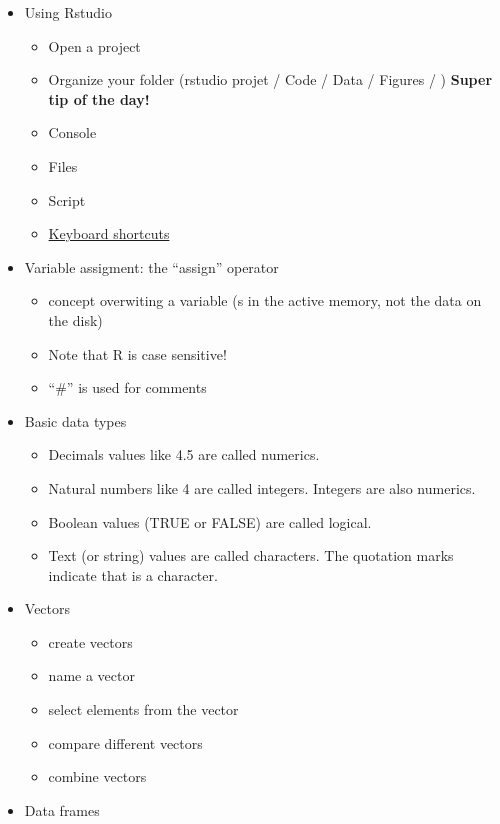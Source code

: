 \documentclass[]{book}
\providecommand{\tightlist}{%
  \setlength{\itemsep}{0pt}\setlength{\parskip}{0pt}}
\theoremstyle{definition}
\theoremstyle{definition}
\theoremstyle{definition}
\theoremstyle{remark}
\begin{document}
\begin{itemize}
\tightlist
\item
  Using Rstudio

  \begin{itemize}
  \tightlist
  \item
    Open a project
  \item
    Organize your folder (rstudio projet / Code / Data / Figures / )
    \textbf{Super tip of the day!}
  \item
    Console
  \item
    Files
  \item
    Script
  \item
    \href{https://support.rstudio.com/hc/en-us/articles/200711853-Keyboard-Shortcuts}{Keyboard
    shortcuts}
  \end{itemize}
\item
  Variable assigment: the ``assign'' operator

  \begin{itemize}
  \tightlist
  \item
    concept overwiting a variable (s in the active memory, not the data
    on the disk)
  \item
    Note that R is case sensitive!
  \item
    ``\#'' is used for comments
  \end{itemize}
\item
  Basic data types

  \begin{itemize}
  \tightlist
  \item
    Decimals values like 4.5 are called numerics.
  \item
    Natural numbers like 4 are called integers. Integers are also
    numerics.
  \item
    Boolean values (TRUE or FALSE) are called logical.
  \item
    Text (or string) values are called characters. The quotation marks
    indicate that is a character.
  \end{itemize}
\item
  Vectors

  \begin{itemize}
  \tightlist
  \item
    create vectors
  \item
    name a vector
  \item
    select elements from the vector
  \item
    compare different vectors
  \item
    combine vectors
  \end{itemize}
\item
  Data frames


\end{itemize}
\end{document}
